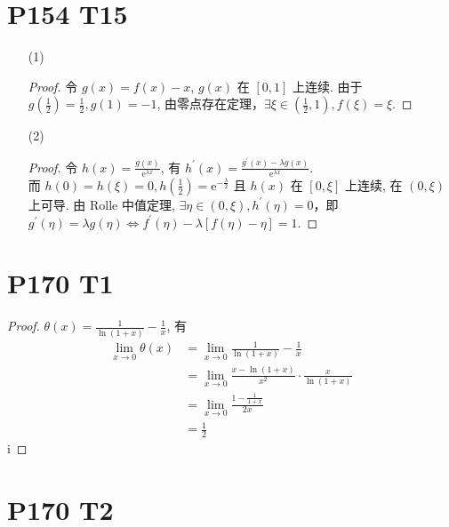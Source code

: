 \documentclass{article}
\newcommand{\ds}{^\prime}
\begin{document}
\section*{P154 T15}

\begin{itemize}
    \item [(1)]
    \begin{proof}
        令 $g(x) = f(x) - x$, $g(x)$ 在 $[0, 1]$ 上连续. 由于 $g\left(\frac{1}{2}\right) = \frac{1}{2}, g(1) = -1$, 由零点存在定理，$\exists \xi \in \left(\frac{1}{2}, 1\right), f(\xi) = \xi$.
    \end{proof}
    \item [(2)]
    \begin{proof}
        令 $h(x) = \frac{g(x)}{\mathrm{e}^{\lambda x}}$, 有 $h\ds(x) = \frac{g\ds(x) - \lambda g(x)}{\mathrm{e}^{\lambda x}}$. \\
        而 $h(0) = h(\xi) = 0, h\left(\frac{1}{2}\right) = \mathrm{e}^{-\frac{\lambda}{2}}$ 且 $h(x)$ 在 $[0, \xi]$ 上连续, 在 $(0, \xi)$ 上可导. 由 Rolle 中值定理, $\exists \eta \in (0, \xi), h\ds(\eta) = 0$，即 $g\ds(\eta) = \lambda g(\eta) \Leftrightarrow f\ds(\eta) - \lambda [f(\eta) - \eta] = 1$.
    \end{proof}
\end{itemize}

\section*{P170 T1}

\begin{proof}
    $\theta(x) = \frac{1}{\ln(1 + x)} - \frac{1}{x}$, 有
    \begin{align*}
        \lim_{x \to 0}\theta(x) & = \lim_{x \to 0}\frac{1}{\ln(1 + x)} - \frac{1}{x} \\
        & = \lim_{x \to 0}\frac{x - \ln (1 + x)}{x^2}\cdot \frac{x}{\ln(1 + x)} \\
        & = \lim_{x \to 0}\frac{1 - \frac{1}{1 + x}}{2x} \\
        & = \frac{1}{2}
    \end{align*}
    i
\end{proof}

\section*{P170 T2}
\end{document}
